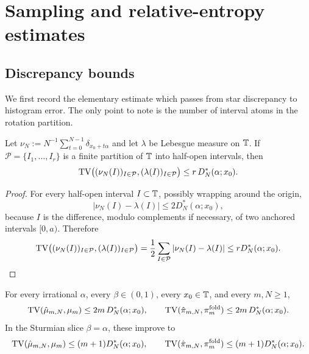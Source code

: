 \section{Sampling and relative-entropy estimates}

\subsection{Discrepancy bounds}

We first record the elementary estimate which passes from star discrepancy to
histogram error.  The only point to note is the number of interval atoms in the
rotation partition.

\begin{lemma}\label{lem:interval-partition-star-discrepancy}
Let \(\nu_N:=N^{-1}\sum_{t=0}^{N-1}\delta_{x_0+t\alpha}\) and let
\(\lambda\) be Lebesgue measure on \(\mathbb{T}\).  If
\(\mathcal P=\{I_1,\dots,I_r\}\) is a finite partition of \(\mathbb{T}\) into
half-open intervals, then
\[
\operatorname{TV}\bigl((\nu_N(I))_{I\in\mathcal P},(\lambda(I))_{I\in\mathcal P}\bigr)
\le r\,D_N^*(\alpha;x_0).
\]
\end{lemma}

\begin{proof}
For every half-open interval \(I\subset\mathbb{T}\), possibly wrapping around the
origin,
\[
|\nu_N(I)-\lambda(I)|\le 2D_N^*(\alpha;x_0),
\]
because \(I\) is the difference, modulo complements if necessary, of two
anchored intervals \([0,a)\).  Therefore
\[
\operatorname{TV}\bigl((\nu_N(I))_{I\in\mathcal P},(\lambda(I))_{I\in\mathcal P}\bigr)
=\frac12\sum_{I\in\mathcal P}|\nu_N(I)-\lambda(I)|
\le rD_N^*(\alpha;x_0).
\]
\end{proof}

\begin{theorem}\label{thm:tv-certificate-hist}
For every irrational \(\alpha\), every \(\beta\in(0,1)\), every
\(x_0\in\mathbb{T}\), and every \(m,N\ge1\),
\[
\operatorname{TV}(\hat\mu_{m,N},\mu_m)
\le 2m\,D_N^*(\alpha;x_0),
\qquad
\operatorname{TV}(\hat\pi_{m,N},\pi_m^{\mathrm{fold}})
\le 2m\,D_N^*(\alpha;x_0).
\]
In the Sturmian slice \(\beta=\alpha\), these improve to
\[
\operatorname{TV}(\hat\mu_{m,N},\mu_m)
\le (m+1)D_N^*(\alpha;x_0),
\qquad
\operatorname{TV}(\hat\pi_{m,N},\pi_m^{\mathrm{fold}})
\le (m+1)D_N^*(\alpha;x_0).
\]
\end{theorem}

